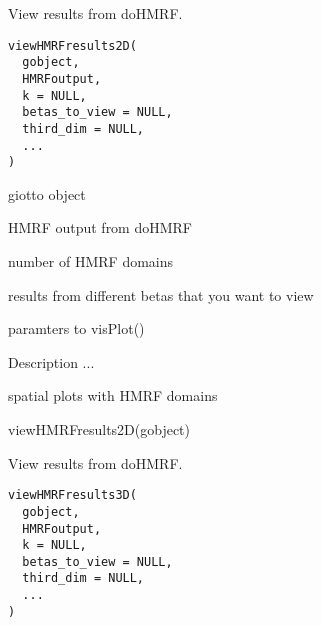 \documentclass[a4paper]{book}
\begin{document}
%
\begin{Description}\relax
View results from doHMRF.
\end{Description}
%
\begin{Usage}
\begin{verbatim}
viewHMRFresults2D(
  gobject,
  HMRFoutput,
  k = NULL,
  betas_to_view = NULL,
  third_dim = NULL,
  ...
)
\end{verbatim}
\end{Usage}
%
\begin{Arguments}
\begin{ldescription}
\item[\code{gobject}] giotto object

\item[\code{HMRFoutput}] HMRF output from doHMRF

\item[\code{k}] number of HMRF domains

\item[\code{betas\_to\_view}] results from different betas that you want to view

\item[\code{...}] paramters to visPlot()
\end{ldescription}
\end{Arguments}
%
\begin{Details}\relax
Description ...
\end{Details}
%
\begin{Value}
spatial plots with HMRF domains
\end{Value}
%
\begin{SeeAlso}\relax
{}
\end{SeeAlso}
%
\begin{Examples}
\begin{ExampleCode}
    viewHMRFresults2D(gobject)
\end{ExampleCode}
\end{Examples}
%
\begin{Description}\relax
View results from doHMRF.
\end{Description}
%
\begin{Usage}
\begin{verbatim}
viewHMRFresults3D(
  gobject,
  HMRFoutput,
  k = NULL,
  betas_to_view = NULL,
  third_dim = NULL,
  ...
)
\end{verbatim}
\end{Usage}
%
\end{document}
